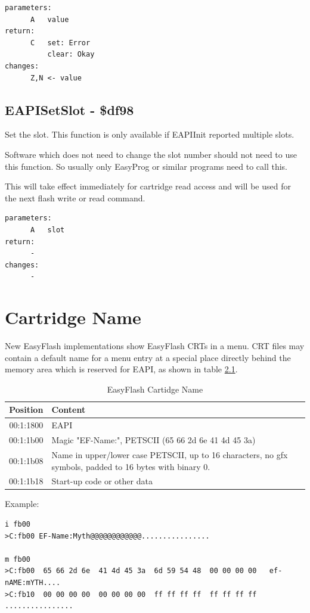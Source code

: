 \documentclass[a4paper,oneside]{memoir}
\begin{document}
\begin{verbatim}
parameters:
      A   value
return:
      C   set: Error
          clear: Okay
changes:
      Z,N <- value
\end{verbatim}


\section{EAPISetSlot - \$df98}

Set the slot. This function is only available if EAPIInit reported
multiple slots.

Software which does not need to change the slot number should not need to
use this function. So usually only EasyProg or similar programs need to call
this.

This will take effect immediately for cartridge read access
and will be used for the next flash write or read command.

\begin{verbatim}
parameters:
      A   slot
return:
      -
changes:
      -
\end{verbatim}

\chapter{Cartridge Name}\label{cartridge-name}

New EasyFlash implementations show EasyFlash CRTs in a menu. CRT files may
contain a default name for a menu entry at a special place directly behind the
memory area which is reserved for EAPI, as shown in table \ref{tab:cartridge-name}.

\begin{table}[!htbp]
    \centering
    \begin{tabularx}{\textwidth}{ cX }
        \toprule
        Position & Content \\
        \midrule
        00:1:1800 & EAPI \\[3pt]
        00:1:1b00 & Magic "EF-Name:", PETSCII (65 66 2d 6e 41 4d 45 3a) \\[3pt]
        00:1:1b08 & Name in upper/lower case PETSCII, up to 16 characters, no gfx symbols, padded to 16 bytes with binary 0. \\[3pt]
        00:1:1b18 & Start-up code or other data \\[3pt]
        \bottomrule
    \end{tabularx}
    \caption{EasyFlash Cartidge Name}
    \label{tab:cartridge-name}
\end{table}

Example:

\footnotesize
\begin{verbatim}
i fb00
>C:fb00 EF-Name:Myth@@@@@@@@@@@@................

m fb00
>C:fb00  65 66 2d 6e  41 4d 45 3a  6d 59 54 48  00 00 00 00   ef-nAME:mYTH....
>C:fb10  00 00 00 00  00 00 00 00  ff ff ff ff  ff ff ff ff   ................
\end{verbatim}
\normalsize
\end{document}
